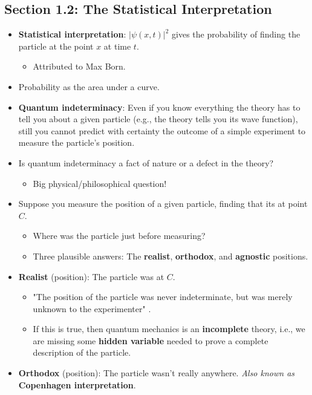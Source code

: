 \documentclass[../notes.tex]{subfiles}
\begin{document}
\subsection*{Section 1.2: The Statistical Interpretation}
\begin{itemize}
    \item \textbf{Statistical interpretation}: $|\psi(x,t)|^2$ gives the probability of finding the particle at the point $x$ at time $t$.
    \begin{itemize}
        \item Attributed to Max Born.
    \end{itemize}
    \item Probability as the area under a curve.
    \item \textbf{Quantum indeterminacy}: Even if you know everything the theory has to tell you about a given particle (e.g., the theory tells you its wave function), still you cannot predict with certainty the outcome of a simple experiment to measure the particle's position.
    \item Is quantum indeterminacy a fact of nature or a defect in the theory?
    \begin{itemize}
        \item Big physical/philosophical question!
    \end{itemize}
    \item Suppose you measure the position of a given particle, finding that its at point $C$.
    \begin{itemize}
        \item Where was the particle just before measuring?
        \item Three plausible answers: The \textbf{realist}, \textbf{orthodox}, and \textbf{agnostic} positions.
    \end{itemize}
    \item \textbf{Realist} (position): The particle was at $C$.
    \begin{itemize}
        \item "The position of the particle was never indeterminate, but was merely unknown to the experimenter" \parencite[17]{bib:Griffiths}.
        \item If this is true, then quantum mechanics is an \textbf{incomplete} theory, i.e., we are missing some \textbf{hidden variable} needed to prove a complete description of the particle.
    \end{itemize}
    \item \textbf{Orthodox} (position): The particle wasn't really anywhere. \emph{Also known as} \textbf{Copenhagen interpretation}.

\end{itemize}
\end{document}
